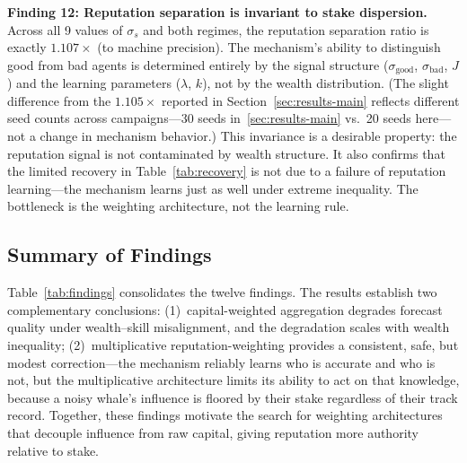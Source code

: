 \documentclass[conference]{IEEEtran}
\begin{document}
\smallskip\noindent\textbf{Finding 12: Reputation separation is invariant to stake dispersion.} Across all 9 values of $\sigma_s$ and both regimes, the reputation separation ratio is exactly $1.107\times$ (to machine precision). The mechanism's ability to distinguish good from bad agents is determined entirely by the signal structure ($\sigma_{\text{good}}$, $\sigma_{\text{bad}}$, $J$) and the learning parameters ($\lambda$, $k$), not by the wealth distribution. (The slight difference from the $1.105\times$ reported in Section~\ref{sec:results-main} reflects different seed counts across campaigns---30 seeds in~\ref{sec:results-main} vs.\ 20 seeds here---not a change in mechanism behavior.) This invariance is a desirable property: the reputation signal is not contaminated by wealth structure. It also confirms that the limited recovery in Table~\ref{tab:recovery} is not due to a failure of reputation learning---the mechanism learns just as well under extreme inequality. The bottleneck is the weighting architecture, not the learning rule.

\subsection{Summary of Findings}
\label{sec:results-summary}

Table~\ref{tab:findings} consolidates the twelve findings. The results establish two complementary conclusions: (1)~capital-weighted aggregation degrades forecast quality under wealth--skill misalignment, and the degradation scales with wealth inequality; (2)~multiplicative reputation-weighting provides a consistent, safe, but modest correction---the mechanism reliably learns who is accurate and who is not, but the multiplicative architecture limits its ability to act on that knowledge, because a noisy whale's influence is floored by their stake regardless of their track record. Together, these findings motivate the search for weighting architectures that decouple influence from raw capital, giving reputation more authority relative to stake.
\end{document}
